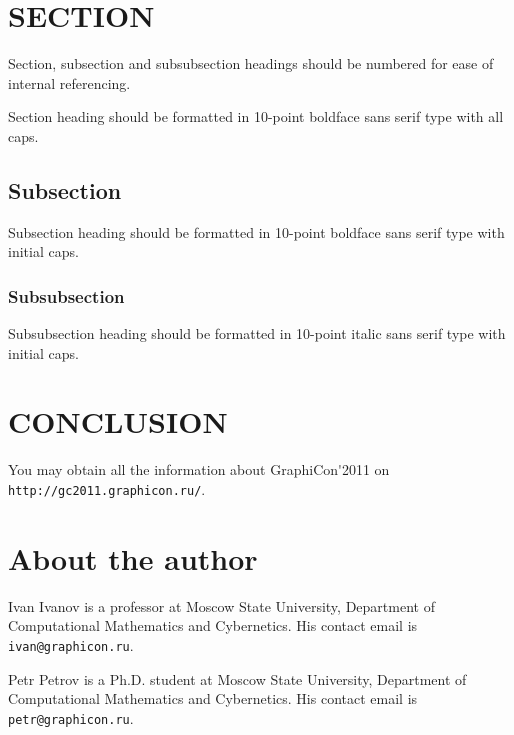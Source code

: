 \documentclass{graphicon}
\begin{document}
\section{SECTION}

Section, subsection and subsubsection headings should be numbered for ease of internal referencing.

Section heading should be formatted in 10-point boldface sans serif type with all caps.

\subsection {Subsection}

Subsection heading should be formatted in 10-point boldface sans serif type with initial caps.

\subsubsection{Subsubsection}

Subsubsection heading should be formatted in 10-point italic sans serif type with initial caps.

\section{CONCLUSION}

You may obtain all the information about GraphiCon\'{}2011 on \texttt{http://gc2011.graphicon.ru/}.




\section*{About the author}

Ivan Ivanov is a professor at Moscow State University, Department of Computational Mathematics and Cybernetics. His contact email is \texttt{ivan@graphicon.ru}.

Petr Petrov is a Ph.D. student at Moscow State University, Department of Computational Mathematics and Cybernetics. His contact email is \texttt{petr@graphicon.ru}.
\end{document}
